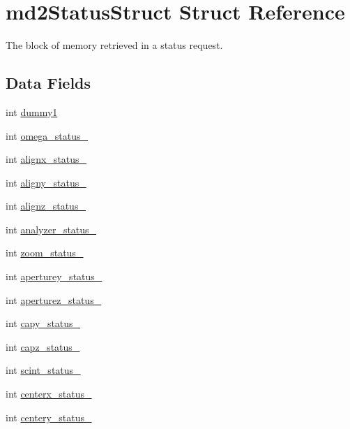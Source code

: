 \hypertarget{structmd2StatusStruct}{
\section{md2StatusStruct Struct Reference}
\label{structmd2StatusStruct}
}


The block of memory retrieved in a status request.  
\subsection*{Data Fields}
\begin{DoxyCompactItemize}
\item 
int \hyperlink{structmd2StatusStruct_a3a2dff3e6a1a346806a655e8404e0f53}{dummy1}
\item 
int \hyperlink{structmd2StatusStruct_af6cf3cd65b9ef205685a0d970f168907}{omega\_\-status\_}
\item 
int \hyperlink{structmd2StatusStruct_a56accf8cb00c59bff87ed75df7dafbbe}{alignx\_\-status\_}
\item 
int \hyperlink{structmd2StatusStruct_a2f2a11fe2fc7a446323def2be465185a}{aligny\_\-status\_}
\item 
int \hyperlink{structmd2StatusStruct_aadbfac5709de57e449a37e2937d6ade7}{alignz\_\-status\_}
\item 
int \hyperlink{structmd2StatusStruct_ab876b484f55bcce576fcd89dcc3f7267}{analyzer\_\-status\_}
\item 
int \hyperlink{structmd2StatusStruct_af28e978b761dc07eefed3971547cfd4d}{zoom\_\-status\_}
\item 
int \hyperlink{structmd2StatusStruct_a2ef953eaddf7058bf4276585e6ff066b}{aperturey\_\-status\_}
\item 
int \hyperlink{structmd2StatusStruct_a27880dd795e1ba4fea4870c64ee3aa84}{aperturez\_\-status\_}
\item 
int \hyperlink{structmd2StatusStruct_a7f4e945e80b1980b9e69366a69ad79cc}{capy\_\-status\_}
\item 
int \hyperlink{structmd2StatusStruct_a719db4477f35331eaa8b7b44150e88a2}{capz\_\-status\_}
\item 
int \hyperlink{structmd2StatusStruct_a1723870357f428ac5c2758a2c9a475c7}{scint\_\-status\_}
\item 
int \hyperlink{structmd2StatusStruct_aa619cdbd7a563408c6b825ddc4f74ebb}{centerx\_\-status\_}
\item 
int \hyperlink{structmd2StatusStruct_a57f65ebe28ef88f1c632d9f35d9167eb}{centery\_\-status\_}

\end{DoxyCompactItemize}
